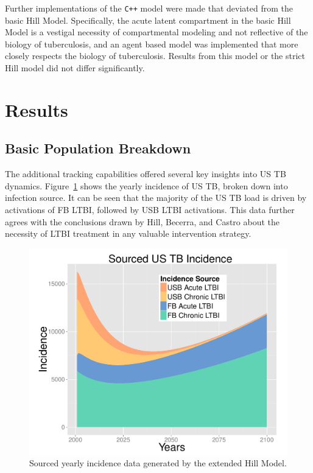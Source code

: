 \documentclass{amsart}
\begin{document}
Further implementations of the \texttt{C++} model were made that deviated from
the basic Hill Model. Specifically, the acute latent compartment in the basic
Hill Model is a vestigal necessity of compartmental modeling and not reflective
of the biology of tuberculosis, and an agent based model was implemented that
more closely respects the biology of tuberculosis. Results from this model or
the strict Hill model did not differ significantly. 
\section{Results}
\subsection{Basic Population Breakdown}
The additional tracking capabilities offered several key insights into US TB
dynamics. Figure~\ref{fig:incPlotSourced} shows the yearly incidence of US TB, broken
down into infection source. It can be seen that the majority of the US TB load
is driven by activations of FB LTBI, followed by USB LTBI activations. This data
further agrees with the conclusions drawn by Hill, Becerra, and Castro about the
necessity of LTBI treatment in any valuable intervention strategy. 
\begin{figure}[h]
  \begin{center}
    \includegraphics[scale=.5]{incPlotSourced}
  \end{center}
  \caption{Sourced yearly incidence data generated by the extended Hill Model.}
  \label{fig:incPlotSourced}
\end{figure}
\end{document}
